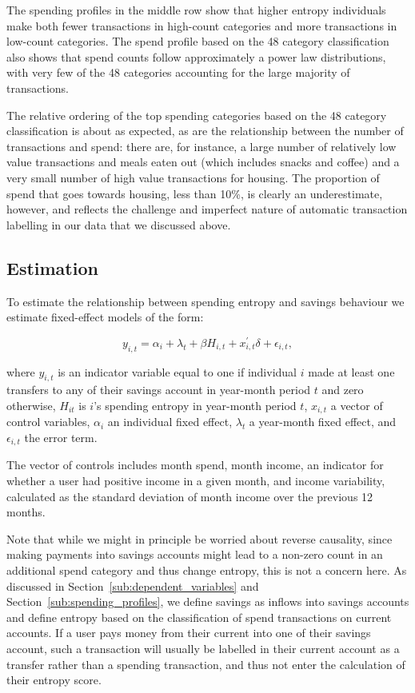 The spending profiles in the middle row show that higher entropy individuals
make both fewer transactions in high-count categories and more transactions in
low-count categories. The spend profile based on the 48 category classification
also shows that spend counts follow approximately a power law distributions,
with very few of the 48 categories accounting for the large majority of
transactions.

The relative ordering of the top spending categories based on the 48 category
classification is about as expected, as are the relationship between the number
of transactions and spend: there are, for instance, a large number of
relatively low value transactions and meals eaten out (which includes snacks
and coffee) and a very small number of high value transactions for housing. The
proportion of spend that goes towards housing, less than 10\%, is clearly an
underestimate, however, and reflects the challenge and imperfect nature of
automatic transaction labelling in our data that we discussed above.

\subsection{Estimation}%
\label{sub:estimation}

To estimate the relationship between spending entropy and savings behaviour we
estimate fixed-effect models of the form: 

\begin{equation}
    \label{equ:model}
    y_{i,t} = \alpha_i + \lambda_t + \beta H_{i,t} + x^\prime_{i,t} \delta +
    \epsilon_{i,t},
\end{equation}

\noindent where $y_{i,t}$ is an indicator variable equal to one if individual
$i$ made at least one transfers to any of their savings account in year-month
period $t$ and zero otherwise, $H_{it}$ is $i$'s spending entropy in year-month
period $t$, $x_{i,t}$ a vector of control variables, $\alpha_i$ an individual
fixed effect, $\lambda_t$ a year-month fixed effect, and $\epsilon_{i, t}$ the
error term.

The vector of controls includes month spend, month income, an indicator for
whether a user had positive income in a given month, and income
variability, calculated as the standard deviation of month income over the
previous 12 months.

Note that while we might in principle be worried about reverse causality, since
making payments into savings accounts might lead to a non-zero count in an
additional spend category and thus change entropy, this is not a concern here.
As discussed in Section~\ref{sub:dependent_variables} and
Section~\ref{sub:spending_profiles}, we define savings as inflows into savings
accounts and define entropy based on the classification of spend transactions
on current accounts. If a user pays money from their current into one of their
savings account, such a transaction will usually be labelled in their current
account as a transfer rather than a spending transaction, and thus not enter
the calculation of their entropy score.

